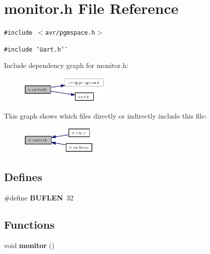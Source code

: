 \section{monitor.h File Reference}
\label{monitor_8h}
{\tt \#include $<$avr/pgmspace.h$>$}\par
{\tt \#include \char`\"{}uart.h\char`\"{}}\par


Include dependency graph for monitor.h:\begin{figure}[H]
\begin{center}
\leavevmode
\includegraphics[width=122pt]{monitor_8h__incl}
\end{center}
\end{figure}


This graph shows which files directly or indirectly include this file:\begin{figure}[H]
\begin{center}
\leavevmode
\includegraphics[width=105pt]{monitor_8h__dep__incl}
\end{center}
\end{figure}
\subsection*{Defines}
\begin{CompactItemize}
\item 
\#define {\bf BUFLEN}~32
\end{CompactItemize}
\subsection*{Functions}
\begin{CompactItemize}
\item 
void {\bf monitor} ()
\end{CompactItemize}
